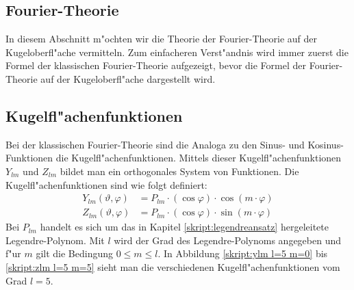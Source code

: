 \begin{refsection}
\section{Fourier-Theorie}
In diesem Abschnitt m"ochten wir die Theorie der Fourier-Theorie
auf der Kugeloberfl"ache vermitteln. 
Zum einfacheren Verst"andnis wird immer zuerst die Formel der 
klassischen Fourier-Theorie aufgezeigt, bevor die Formel der 
Fourier-Theorie auf der Kugeloberfl"ache dargestellt wird.

\subsection{Kugelfl"achenfunktionen}
Bei der klassischen Fourier-Theorie sind die Analoga zu den Sinus- 
und Kosinus-Funktionen die Kugelfl"achenfunktionen. 
Mittels dieser Kugelfl"achenfunktionen $Y_{lm}$ und $Z_{lm}$ 
bildet man ein orthogonales System von Funktionen. 
Die Kugelfl"achenfunktionen sind wie folgt definiert:
\begin{align*}
Y_{lm}(\vartheta, \varphi)& = P_{lm} \cdot (\cos \varphi) \cdot \cos(m \cdot \varphi)
\\
Z_{lm}(\vartheta, \varphi)& = P_{lm} \cdot (\cos \varphi) \cdot \sin(m \cdot \varphi)
\end{align*}
Bei $P_{lm}$ handelt es sich um das in Kapitel \ref{skript:legendreansatz} 
hergeleitete Legendre-Polynom. 
Mit $l$ wird der Grad des Legendre-Polynoms angegeben und f"ur $m$
gilt die Bedingung $0 \leq m \leq l$.  
In Abbildung \ref{skript:ylm l=5 m=0} bis \ref{skript:zlm l=5 m=5} sieht man die verschiedenen 
Kugelfl"achenfunktionen vom Grad $l = 5$.


\end{refsection}

